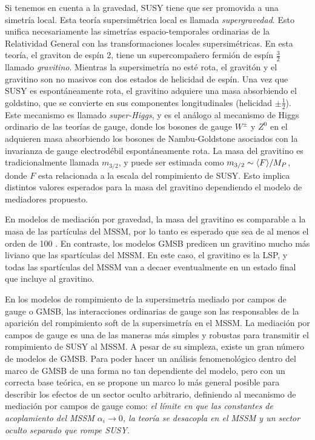Si tenemos en cuenta a la gravedad, SUSY tiene que ser promovida a una simetría
local. Esta teoría supersimétrica local es llamada \emph{supergravedad}. Esto
unifica necesariamente las simetrías espacio-temporales ordinarias de la
Relatividad General con las transformaciones locales supersimétricas. En esta
teoría, el graviton de espín 2, tiene un supercompa\~nero fermión de espín $\frac{3}{2}$
llamado \emph{gravitino}. Mientras la supersimetría no esté rota, el gravitón y
el gravitino son no masivos con dos estados de helicidad de espín. Una vez que
SUSY es espontáneamente rota, el gravitino adquiere una masa absorbiendo el
goldstino, que se convierte en sus componentes longitudinales (helicidad $\pm
\frac{1}{2}$). Este mecanismo es llamado \emph{super-Higgs}, y es el análogo al
mecanismo de Higgs ordinario de las teorías de gauge, donde los bosones de gauge
$W^\pm$ y $Z^0$ en el {\SM} adquieren masa absorbiendo los bosones de
Nambu-Goldstone asociados con la invarianza de gauge electrodébil
espontáneamente rota. La masa del gravitino es tradicionalmente llamada
$m_{3/2}$, y puede ser estimada como $m_{3/2} \sim \langle F \rangle / M_P$,
donde $F$ esta relacionada a la escala del rompimiento de SUSY. Esto implica
distintos valores esperados para la masa del gravitino dependiendo el modelo de
mediadores propuesto.

En modelos de mediación por gravedad, la masa del gravitino es comparable a la
masa de las partículas del MSSM, por lo tanto es esperado que sea de al menos el
orden de 100 \gev. En contraste, los modelos GMSB predicen un gravitino mucho
más liviano que las spartículas del MSSM. En este caso, el gravitino es la LSP,
y todas las spartículas del MSSM van a decaer eventualmente en un estado final
que incluye al gravitino.

En los modelos de rompimiento de la supersimetría mediado por campos de gauge o
GMSB, las interacciones ordinarias de gauge son las responsables de la aparición
del rompimiento soft de la supersimetría en el MSSM.
La mediación por campos de gauge es una de las maneras más simples y robustas
para transmitir el rompimiento de SUSY al MSSM. A pesar de su simpleza, existe
un gran número de modelos de GMSB. Para poder hacer un análisis fenomenológico
dentro del marco de GMSB de una forma no tan dependiente del modelo, pero con un
correcta base teórica, en \cite{GGM} se propone un marco lo más general posible
para describir los efectos de un sector oculto arbitrario, definiendo al
mecanismo de mediación por campos de gauge como: \emph{el límite en que las
  constantes de acoplamiento del MSSM $\alpha_i \to 0$, la teoría se desacopla
  en el MSSM y un sector oculto separado que rompe SUSY.}

